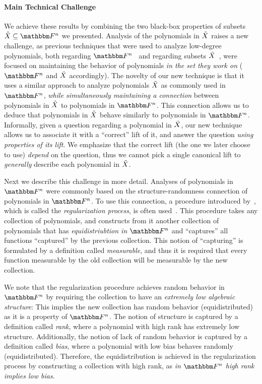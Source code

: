 \paragraph{Main Technical Challenge}
We achieve these results by combining the two black-box properties of subsets $\variety \subseteq \field$ we presented.
Analysis of the polynomials in ${\tilde{X}}$ raises a new challenge, as previous techniques that were used to analyze low-degree polynomials,
both regarding $\field$~\cite{green2007distribution} and regarding subsets ${\tilde{X}}$~\cite{lampert2021relative},
were focused on maintaining the behavior of polynomials \emph{in the set they work on} ($\field$ and ${\tilde{X}}$ accordingly).
\newline
The novelty of our new technique is that it uses a similar approach to analyze polynomials ${\tilde{X}}$ as commonly used in $\field$,
\emph{while simultaneously maintaining a connection} between polynomials in ${\tilde{X}}$ to polynomials in $\field$.
This connection allows us to deduce that polynomials in ${\tilde{X}}$ behave similarly to polynomials in $\field$.
Informally, given a question regarding a polynomial in ${\tilde{X}}$, our new technique allows us to
associate it with a ``correct'' lift of it, and answer the question \emph{using properties of its lift}.
We emphasize that the correct lift (the one we later choose to use) \emph{depend} on the question,
thus we cannot pick a single canonical lift to \emph{generally} describe each polynomial in ${\tilde{X}}$.

Next we describe this challenge in more detail.
\newline
Analyses of polynomials in $\field$ were commonly based on the structure-randomness connection of polynomials in $\field$.
To use this connection, a procedure introduced by~\cite{green2007distribution}, which is called the \emph{regularization process}, is often used~\cite{kaufman2008worst, tao2011inverse, hatami2011higher, bhattacharyya2013locally, bhattacharyya2013algorithmic, DBLP:journals/corr/0001L15}.
This procedure takes any collection of polynomials, and constructs from it another collection of polynomials that has \emph{equidistriubtion in $\field$}
and ``captures'' all functions ``captured'' by the previous collection.
This notion of ``capturing'' is formulated by a definition called \emph{measurable},
and thus it is required that every function measurable by the old collection will be measurable by the new collection.

We note that the regularization procedure achieves random behavior in $\field$ by requiring the collection to have an \emph{extremely low algebraic structure}:
This implies the new collection has random behavior (equidistributed) as it is a property of $\field$.
The notion of structure is captured by a definition called \emph{rank}, where a polynomial with high rank has extremely low structure.
Additionally, the notion of lack of random behavior is captured by a definition called \emph{bias}, where a polynomial with low bias behaves randomly (equidistributed).
Therefore, the equidistribution is achieved in the regularization process by constructing a collection with high rank, as \emph{in $\field$ high rank implies low bias}.


